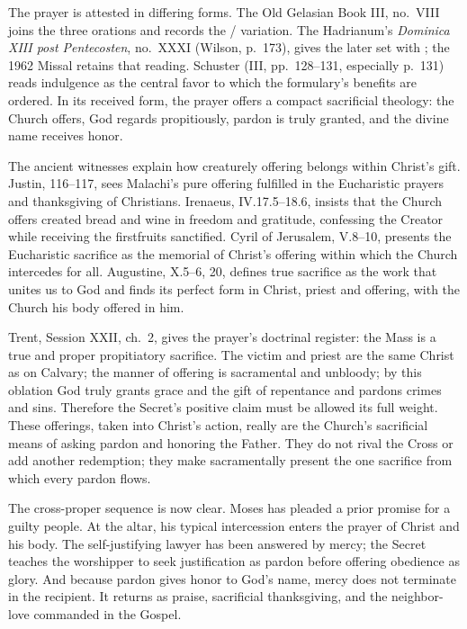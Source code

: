 The prayer is attested in differing forms. The Old Gelasian Book
III, no.~VIII joins the three orations and records the
/ variation. The Hadrianum's
\emph{Dominica XIII post Pentecosten}, no.~XXXI (Wilson, p.~173), gives the
later set with ; the 1962 Missal retains that reading.
Schuster (III, pp.~128--131, especially p.~131) reads indulgence as the
central favor to which the formulary's benefits are ordered. In its received
form, the prayer offers a compact sacrificial theology: the Church offers, God
regards propitiously, pardon is truly granted, and the divine name receives
honor.

The ancient witnesses explain how creaturely offering belongs within Christ's
gift. Justin,  116--117, sees Malachi's pure
offering fulfilled in the Eucharistic prayers and thanksgiving of Christians.
Irenaeus,  IV.17.5--18.6, insists that the Church offers
created bread and wine in freedom and gratitude, confessing the Creator while
receiving the firstfruits sanctified. Cyril of Jerusalem,
 V.8--10, presents the Eucharistic sacrifice as
the memorial of Christ's offering within which the Church intercedes for all.
Augustine,  X.5--6, 20, defines true sacrifice as the work
that unites us to God and finds its perfect form in Christ, priest and offering,
with the Church his body offered in him.

Trent, Session XXII, ch.~2, gives the prayer's doctrinal register: the Mass is
a true and proper propitiatory sacrifice. The victim and priest are the same
Christ as on Calvary; the manner of offering is sacramental and unbloody; by
this oblation God truly grants grace and the gift of repentance and pardons
crimes and sins. Therefore the Secret's positive claim must be allowed its
full weight. These offerings, taken into Christ's action, really are the
Church's sacrificial means of asking pardon and honoring the Father. They do
not rival the Cross or add another redemption; they make sacramentally present
the one sacrifice from which every pardon flows.

The cross-proper sequence is now clear. Moses has pleaded a prior promise for
a guilty people. At the altar, his typical intercession enters the prayer of
Christ and his body. The self-justifying lawyer has been answered by mercy; the
Secret teaches the worshipper to seek justification as pardon before offering
obedience as glory. And because pardon gives honor to God's name, mercy does
not terminate in the recipient. It returns as praise, sacrificial
thanksgiving, and the neighbor-love commanded in the Gospel.

